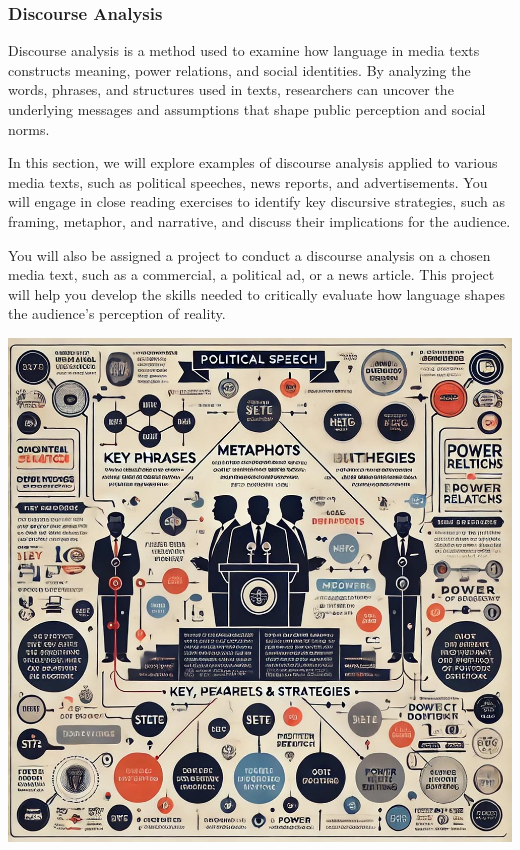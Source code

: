 \documentclass[
]{book}
\begin{document}
\subsubsection{Discourse Analysis}\label{discourse-analysis}

Discourse analysis is a method used to examine how language in media texts constructs meaning, power relations, and social identities. By analyzing the words, phrases, and structures used in texts, researchers can uncover the underlying messages and assumptions that shape public perception and social norms.

In this section, we will explore examples of discourse analysis applied to various media texts, such as political speeches, news reports, and advertisements. You will engage in close reading exercises to identify key discursive strategies, such as framing, metaphor, and narrative, and discuss their implications for the audience.

You will also be assigned a project to conduct a discourse analysis on a chosen media text, such as a commercial, a political ad, or a news article. This project will help you develop the skills needed to critically evaluate how language shapes the audience's perception of reality.

\includegraphics[width=1\textwidth,height=\textheight]{images/fig100.jpg}
\end{document}
